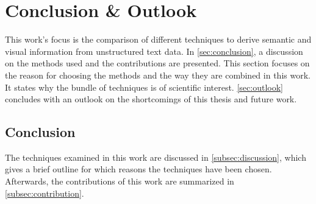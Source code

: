 \chapter{Conclusion \& Outlook}\label{ch:conclusion-outlook}

This work's focus is the comparison of different techniques to derive semantic and visual information from unstructured text data.
In \autoref{sec:conclusion}, a discussion on the methods used and the contributions are presented.
This section focuses on the reason for choosing the methods and the way they are combined in this work.
It states why the bundle of techniques is of scientific interest.
\autoref{sec:outlook} concludes with an outlook on the shortcomings of this thesis and future work.

\section{Conclusion}\label{sec:conclusion}

The techniques examined in this work are discussed in \autoref{subsec:discussion}, 
which gives a brief outline for which reasons the techniques have been chosen.
Afterwards, the contributions of this work are summarized in \autoref{subsec:contribution}.







